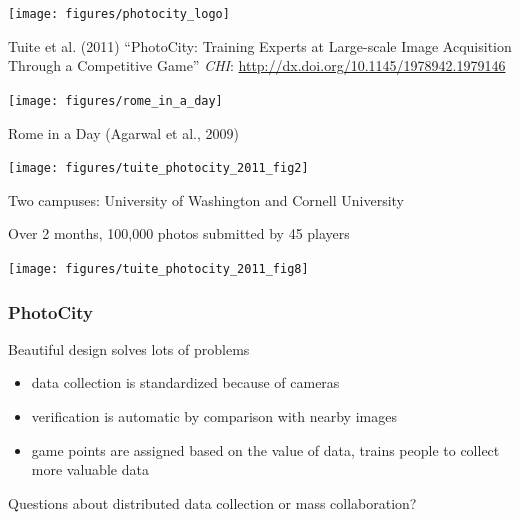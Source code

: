 \documentclass[aspectratio=169]{beamer}
\begin{document}
\begin{frame}

\begin{center}
\texttt{[image: figures/photocity\_logo]}
\end{center}

\small{
Tuite et al. (2011) ``PhotoCity: Training Experts at Large-scale Image Acquisition Through a Competitive Game'' \textit{CHI}:  \url{http://dx.doi.org/10.1145/1978942.1979146}
}

\end{frame}
\begin{frame}

\begin{center}
\texttt{[image: figures/rome\_in\_a\_day]}
\end{center}
Rome in a Day (Agarwal et al., 2009)

\end{frame}
\begin{frame}

\begin{center}
\texttt{[image: figures/tuite\_photocity\_2011\_fig2]}
\end{center}

Two campuses: University of Washington and Cornell University

\end{frame}
\begin{frame}

Over 2 months, 100,000 photos submitted by 45 players
\vfill
\begin{center}
\texttt{[image: figures/tuite\_photocity\_2011\_fig8]}
\end{center}

\end{frame}
\begin{frame}
\frametitle{PhotoCity}

Beautiful design solves lots of problems
\pause
\begin{itemize}
\item data collection is standardized because of cameras
\pause
\item verification is automatic by comparison with nearby images
\pause
\item game points are assigned based on the value of data, trains people to collect more valuable data
\end{itemize}

\end{frame}
\begin{frame}

{\Large
\begin{center}
Questions about distributed data collection or mass collaboration?
\end{center}
}

\end{frame}
\end{document}

